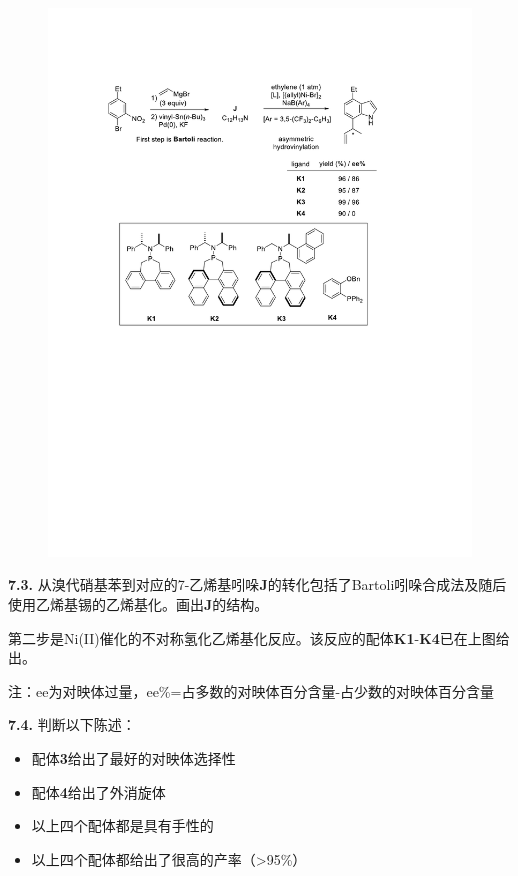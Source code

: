 \begin{figure}[h!]
	\centering
	\includegraphics[width=14cm]{./pic/t7-4.pdf}
\end{figure}

\noindent\textbf{7.3.}
从溴代硝基苯到对应的7-乙烯基吲哚\textbf{J}的转化包括了Bartoli吲哚合成法及随后使用乙烯基锡的乙烯基化。画出\textbf{J}的结构。

第二步是Ni(II)催化的不对称氢化乙烯基化反应。该反应的配体\textbf{K1}-\textbf{K4}已在上图给出。

\noindent 注：ee为对映体过量，ee\%=占多数的对映体百分含量-占少数的对映体百分含量

\noindent\textbf{7.4.} 判断以下陈述：

\renewcommand{\labelitemi}{$\square$}
\begin{itemize}
\item 配体\textbf{3}给出了最好的对映体选择性
\item 配体\textbf{4}给出了外消旋体
\item 以上四个配体都是具有手性的
\item 以上四个配体都给出了很高的产率（\textgreater{}95\%）
\end{itemize}
\renewcommand{\labelitemi}{$\bullet$}

